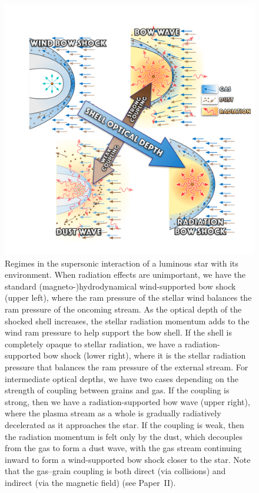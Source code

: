 \begin{figure}
  \centering
  \includegraphics[width=0.8\linewidth]{figs/bows-and-waves}
  \caption{Regimes in the supersonic interaction of a luminous star
    with its environment.  When radiation effects are unimportant, we
    have the standard (magneto-)hydrodynamical wind-supported bow
    shock (upper left), where the ram pressure of the stellar wind
    balances the ram pressure of the oncoming stream.  As the optical
    depth of the shocked shell increases, the stellar radiation
    momentum adds to the wind ram pressure to help support the bow
    shell.  If the shell is completely opaque to stellar radiation, we
    have a radiation-supported bow shock (lower right), where it is
    the stellar radiation pressure that balances the ram pressure of
    the external stream.  For intermediate optical depths, we have two
    cases depending on the strength of coupling between grains and
    gas.  If the coupling is strong, then we have a
    radiation-supported bow wave (upper right), where the plasma
    stream as a whole is gradually radiatively decelerated as it
    approaches the star.  If the coupling is weak, then the radiation
    momentum is felt only by the dust, which decouples from the gas to
    form a dust wave, with the gas stream continuing inward to form a
    wind-supported bow shock closer to the star.  Note that the
    gas--grain coupling is both direct (via collisions) and indirect
    (via the magnetic field) (see Paper~II).}
  \label{fig:3-types-bow}
\end{figure}


